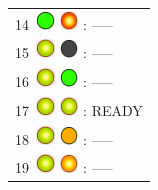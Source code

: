 \documentclass[12pt, a4paper]{report}
\begin{document}
\begin{minipage}{0.45\textwidth}
\begin{Large}
\begin{tabular}{l}
		14\  \includegraphics*[width=5mm]{green_led} \includegraphics*[width=5mm]{red_led_flashing} : -----\\
		
		15\  \includegraphics*[width=5mm]{green_led_flashing} \includegraphics*[width=5mm]{off_led} : -----\\
		
		16\  \includegraphics*[width=5mm]{green_led_flashing} \includegraphics*[width=5mm]{green_led} : -----\\
		
		17\  \includegraphics*[width=5mm]{green_led_flashing} \includegraphics*[width=5mm]{green_led_flashing} : READY\\
		
		18\  \includegraphics*[width=5mm]{green_led_flashing} \includegraphics*[width=5mm]{orange_led} : -----\\
		
		19\  \includegraphics*[width=5mm]{green_led_flashing} \includegraphics*[width=5mm]{orange_led_flashing} : -----\\
		

\end{tabular}
\end{Large}
\end{minipage}
\end{document}
